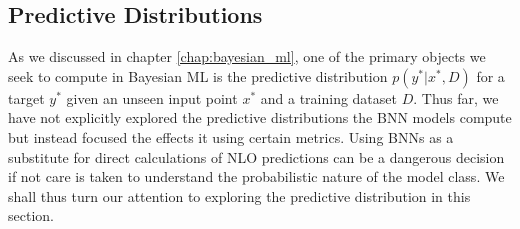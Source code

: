 \subsection{Predictive Distributions}
As we discussed in chapter \ref{chap:bayesian_ml}, one of the primary objects we seek to compute
in Bayesian ML is the predictive distribution $p(y^*|x^*, D)$ for a target $y^*$ given an unseen input point $x^*$ and
a training dataset $D$. Thus far, we have not explicitly explored the predictive distributions the BNN models compute but instead focused the effects it using certain metrics. Using BNNs as a substitute for direct calculations of NLO predictions can be a dangerous decision if not care is taken to understand the probabilistic nature of the model class. We shall thus turn our attention to exploring the predictive distribution in this section.

